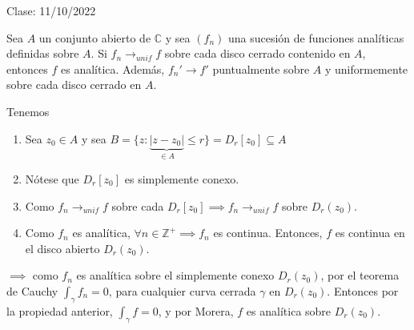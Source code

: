 Clase: 11/10/2022

\begin{teorema}
    Sea $A$ un conjunto abierto de $\mathbb{C}$ y sea $(f_n)$ una sucesión de funciones analíticas definidas sobre $A$. Si $f_n \to_{unif} f$  sobre cada disco cerrado contenido en $A$, entonces $f$ es analítica. Además, $f_n'\to f'$ puntualmente sobre $A$ y uniformemente sobre cada disco cerrado en $A$. 
    \begin{dem}
        Tenemos 
        \begin{enumerate}
            \item Sea $z_0\in A$ y sea $B=\{z:\underbrace{|z-z_0|}_{\in A}\leq r\}=D_r[z_0]\subseteq A$
            \item Nótese que $D_r[z_0]$ es simplemente conexo. 
            \item Como $f_n\to_{unif}f$ sobre cada $D_r[z_0]\implies f_n\to_{unif}f$ sobre $D_r(z_0)$.
            \item  Como $f_n$ es analítica, $\forall n\in \mathbb{Z}^+\implies f_n$ es continua. Entonces, $f$ es continua en el disco abierto $D_r(z_0)$. 
        \end{enumerate}
        $\implies$ como $f_n$ es analítica sobre el simplemente conexo $D_r(z_0)$, por el teorema de Cauchy $\int_\gamma f_n=0$, para cualquier curva cerrada $\gamma$ en $D_r(z_0)$. Entonces por la propiedad anterior, $\int_\gamma f=0$, y por Morera, $f$ es analítica sobre $D_r(z_0)$.
    \end{dem}


\end{teorema}
